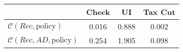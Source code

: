 \begin{tabular}{@{}lccc@{}} 
\toprule 
                          & Check      & UI    & Tax Cut    \\  \midrule 
$\mathcal{C}(Rec,\text{policy})$ & 0.016  & 0.888  & 0.002     \\ 
$\mathcal{C}(Rec, AD,\text{policy})$ & 0.254  & 1.905  & 0.098     \\ 
\end{tabular}  
